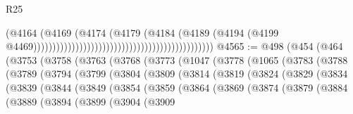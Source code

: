\begin{lexlean}{R25}
\begin{coremodule}
{{{{{{{{{{{{{{{{{{{{{{{{{{{{{{{{{{{{{{{{{{{{{{{{{{{{{{{{{{{{{{{{{{{{{{{{{{{{{{{{{{{{{{{{{{{{{{{{{{{{{{{{{{{{{{{{{{{{{{{{{{{{{{{{{{{{{{{{{{{{{{{{{{{{{{{{{{{{{{{{{{{{{{{{{{{{{{{{{{{{{{{{{{{{{{{{{{{{{{{                                                                                  (@4164
                                                                                    (@4169
                                                                                      (@4174
                                                                                        (@4179
                                                                                          (@4184
                                                                                            (@4189
                                                                                              (@4194
                                                                                                (@4199
                                                                                                  @4469)))))))))))))))))))))))))))))))))))))))))))))))
@4565 := @498
    (@454
      (@464
        (@3753
          (@3758
            (@3763
              (@3768
                (@3773
                  (@1047
                    (@3778
                      (@1065
                        (@3783
                          (@3788
                            (@3789
                              (@3794
                                (@3799
                                  (@3804
                                    (@3809
                                      (@3814
                                        (@3819
                                          (@3824
                                            (@3829
                                              (@3834
                                                (@3839
                                                  (@3844
                                                    (@3849
                                                      (@3854
                                                        (@3859
                                                          (@3864
                                                            (@3869
                                                              (@3874
                                                                (@3879
                                                                  (@3884
                                                                    (@3889
                                                                      (@3894
                                                                        (@3899
                                                                          (@3904
                                                                            (@3909
}}}}}}}}}}}}}}}}}}}}}}}}}}}}}}}}}}}}}}}}}}}}}}}}}}}}}}}}}}}}}}}}}}}}}}}}}}}}}}}}}}}}}}}}}}}}}}}}}}}}}}}}}}}}}}}}}}}}}}}}}}}}}}}}}}}}}}}}}}}}}}}}}}}}}}}}}}}}}}}}}}}}}}}}}}}}}}}}}}}}}}}}}}}}}}}}}}}}}}}
\end{coremodule}
\end{lexlean}
